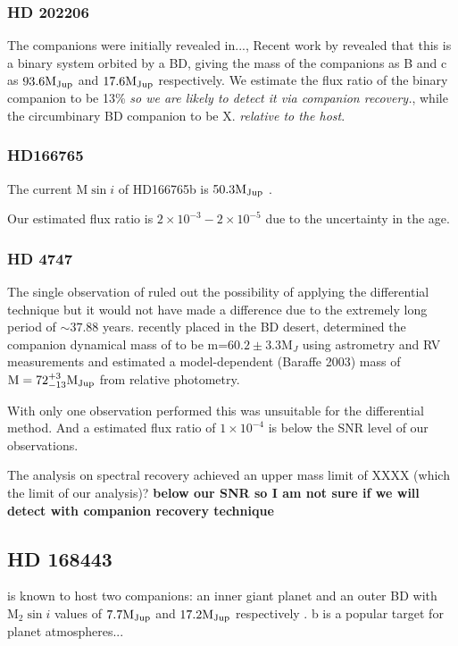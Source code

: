 \subsubsection{HD 202206}
\label{subsubsec:HD202206}
The companions  were initially revealed in..., Recent work by \citet{benedict_hd_2017} revealed that this is a binary system orbited by a BD, giving the mass of the companions as B and  c as \(\rm 93.6 M_{Jup} \) and \(\rm 17.6 M_{Jup} \) respectively.
We estimate the flux ratio of the binary companion to be 13\% \emph{so we are likely to detect it via companion recovery.}, while the circumbinary BD companion to be X. \textit{relative to the host}.


\subsubsection{HD166765}
\label{subsubsec:HD166765}
The current \(\textrm{M}\sin{i} \) of HD166765b is \(\rm 50.3 M_{Jup} \) \citep{patel_fourteen_2007}.


Our estimated flux ratio is \(2\times10^{-3} - 2\times10^{-5} \) due to the uncertainty in the age.


\subsubsection{HD 4747}
\label{subsubsec:HD4747}
The single observation of  ruled out the possibility of applying the differential technique but it would not have made a difference due to the extremely long period of \(\sim37.88 \) years.
\citet{crepp_trends_2016} recently placed  in the BD desert, determined the companion dynamical mass of  to be m=\(60.2\pm3.3\textrm{M}_{J} \) using astrometry and RV measurements and estimated a model-dependent (Baraffe 2003) mass of \(\rm M = 72^{+3}_{-13} M_{Jup} \) from relative photometry.

With only one observation performed this was unsuitable for the differential method. And a estimated flux ratio of \(1\times10^{-4} \) is below the SNR level of our observations.

The analysis on spectral recovery achieved an upper mass limit of XXXX (which the limit of our analysis)?
\textbf{below our SNR so I am not sure if we will detect with companion recovery technique}


\subsection{HD 168443}
\label{subsubsec:HD168443}
 is known to host two companions: an inner giant planet and an outer BD with \(\textrm{M}_{2}\sin{i} \) values of \(7.7 \rm M_{Jup} \) and \(\rm 17.2 M_{Jup} \) respectively \citep{pilyavsky_search_2011}.
b is a popular target for planet atmospheres...

